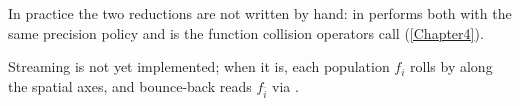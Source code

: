 In practice the two reductions are not written by hand:  in
 performs both with the same precision policy and is the function
collision operators call (\cref{Chapter4}).

Streaming is not yet implemented; when it is, each population $f_i$ rolls by
 along the spatial axes, and bounce-back reads $f_{\bar{i}}$ via
.
